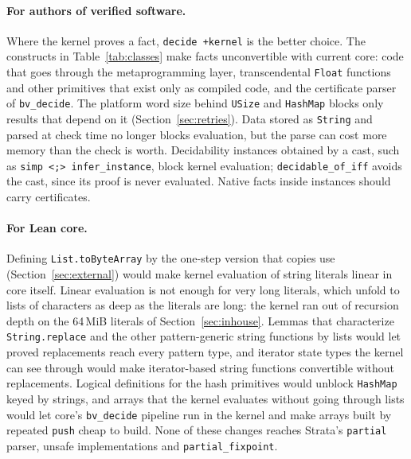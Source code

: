 \documentclass[11pt]{article}
\begin{document}
\paragraph{For authors of verified software.} Where the kernel proves a fact, \texttt{decide +kernel} is the
better choice. The constructs in
Table~\ref{tab:classes} make facts unconvertible with current core: code that goes through the
metaprogramming layer, transcendental \texttt{Float} functions and other primitives that exist only as
compiled code, and the certificate parser of \texttt{bv\_decide}. The platform word size behind \texttt{USize}
and \texttt{HashMap} blocks only results that depend on it (Section~\ref{sec:retries}). Data
stored as \texttt{String} and parsed at check time no longer blocks evaluation, but the parse can cost more
memory than the check is worth. Decidability instances obtained by a cast, such
as \verb|simp <;> infer_instance|, block kernel evaluation; \texttt{decidable\_of\_iff} avoids the cast,
since its proof is never evaluated. Native facts inside instances should carry certificates.

\paragraph{For Lean core.} Defining \texttt{List.toByteArray} by the one-step version that copies use
(Section~\ref{sec:external}) would make kernel evaluation of string literals linear in core itself. Linear
evaluation is not enough for very long literals, which unfold to lists of characters as deep as the literals
are long: the kernel ran out of recursion depth on the 64\,MiB literals of Section~\ref{sec:inhouse}. Lemmas
that characterize \texttt{String.replace} and the other pattern-generic string functions by lists would let
proved replacements reach every pattern type, and iterator state types the kernel can see through would make
iterator-based string functions convertible without replacements. Logical definitions for the hash primitives
would unblock \texttt{HashMap} keyed by strings, and arrays that the kernel evaluates without going through
lists would let core's \texttt{bv\_decide} pipeline run in the
kernel and make arrays built by repeated \texttt{push} cheap to build. None of these changes reaches Strata's
\texttt{partial} parser, unsafe implementations and \texttt{partial\_fixpoint}.
\end{document}
